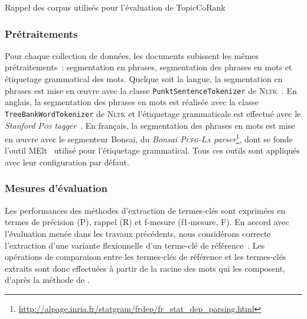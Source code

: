 \begin{table}[!h]
          \caption{Rappel des corpus utilisés pour l'évaluation de TopicCoRank
                   \label{tab:topiccorank:corpora_recap}}
        \end{table}

      \subsubsection{Prétraitements}
      \label{subsubsec:main-automatic_keyphrase_annotation-supervised_automatic_keyphrase_annotation-evaluation-preprocessing}
        Pour chaque collection de données, les documents subissent les mêmes
        prétraitements~: segmentation en phrases, segmentation des phrases en
        mots et étiquetage grammatical des mots. Quelque soit la langue, la
        segmentation en phrases est mise en \oe{}uvre avec la classe
        \texttt{PunktSentenceTokenizer} de \textsc{Nltk}~\cite{bird2009nltk}. En
        anglais, la segmentation des phrases en mots est réalisée avec la classe
        \texttt{TreeBankWordTokenizer} de \textsc{Nltk} et l'étiquetage
        grammaticale est effectué avec le \textit{Stanford \textsc{Pos}
        tagger}~\cite{toutanova2003stanfordpostagger}. En français, la
        segmentation des phrases en mots est mise en \oe{}uvre avec le
        segmenteur Bonsai, du \textit{Bonsai \textsc{Pcfg-La}
        parser}\footnote{\url{http://alpage.inria.fr/statgram/frdep/fr_stat_dep_parsing.html}},
        dont se fonde l'outil MElt~\cite{denis2009melt} utilisé pour
        l'étiquetage grammatical. Tous ces outils sont appliqués avec leur
        configuration par défaut.
      
      \subsubsection{Mesures d'évaluation}
      \label{subsubsec:main-automatic_keyphrase_annotation-supervised_automatic_keyphrase_annotation-evaluation-evaluation_measures}
        Les performances des méthodes d'extraction de termes-clés sont exprimées
        en termes de précision (P), rappel (R) et f-mesure (f1-mesure, F). En
        accord avec l'évaluation menée dans les travaux précédents, nous
        considérons correcte l'extraction d'une variante flexionnelle d'un
        terme-clé de référence~\cite{kim2010semeval}. Les opérations de
        comparaison entre les termes-clés de référence et les termes-clés
        extraits sont donc effectuées à partir de la racine des mots qui les
        composent, d'après la méthode de .

